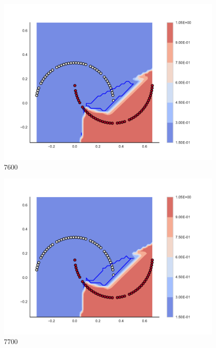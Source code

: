 \begin{subfigure}[b]{0.09\textwidth}
    \includegraphics[clip, trim=2.35cm 1.75cm 4.5cm 0cm,width=\textwidth]{img/convergence/7600.pdf}
    \caption{7600}
    \label{fig:convergence_7600}
\end{subfigure}
%
\begin{subfigure}[b]{0.09\textwidth}
    \includegraphics[clip, trim=2.35cm 1.75cm 4.5cm 0cm,width=\textwidth]{img/convergence/7700.pdf}
    \caption{7700}
    \label{fig:convergence_7700}
\end{subfigure}
%
